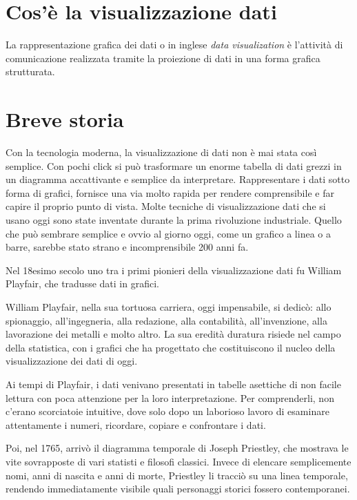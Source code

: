 
\section{Cos'è la visualizzazione dati }
La rappresentazione grafica dei dati o in inglese \emph{data visualization} è l’attività di comunicazione realizzata tramite la proiezione di dati in una forma grafica strutturata.

\section{Breve storia}

Con la tecnologia moderna, la visualizzazione di dati non è mai stata così semplice.
Con pochi click si può trasformare un enorme tabella di dati grezzi in un diagramma accattivante e semplice da interpretare.
Rappresentare i dati sotto forma di grafici, fornisce una via molto rapida per rendere comprensibile e far capire il proprio punto di vista.
Molte tecniche di visualizzazione dati che si usano oggi sono state inventate durante la prima rivoluzione industriale.
Quello che può sembrare semplice e ovvio al giorno  oggi, come un grafico a linea o a barre,  sarebbe stato strano e incomprensibile  200 anni fa.

\noindent Nel 18esimo secolo uno tra i primi pionieri della visualizzazione dati  fu William Playfair, che tradusse dati in grafici. 

\noindent William Playfair, nella sua tortuosa carriera, oggi impensabile, si dedicò: allo spionaggio, all’ingegneria, alla redazione, alla contabilità, all’invenzione, alla lavorazione dei metalli e molto altro. La sua eredità duratura risiede nel campo della statistica, con i grafici che ha progettato che costituiscono il nucleo della visualizzazione dei dati di oggi.

\noindent Ai tempi di Playfair, i dati venivano presentati in tabelle asettiche di non facile lettura con poca attenzione per la loro interpretazione. Per comprenderli, non c’erano scorciatoie intuitive, dove solo dopo un laborioso lavoro di esaminare attentamente i numeri, ricordare, copiare e confrontare i dati.

\noindent Poi, nel 1765, arrivò il diagramma temporale di Joseph Priestley, che mostrava le vite sovrapposte di vari statisti e filosofi classici. Invece di elencare semplicemente nomi, anni di nascita e anni di morte, Priestley li tracciò su una linea temporale, rendendo immediatamente visibile quali personaggi storici fossero contemporanei.

